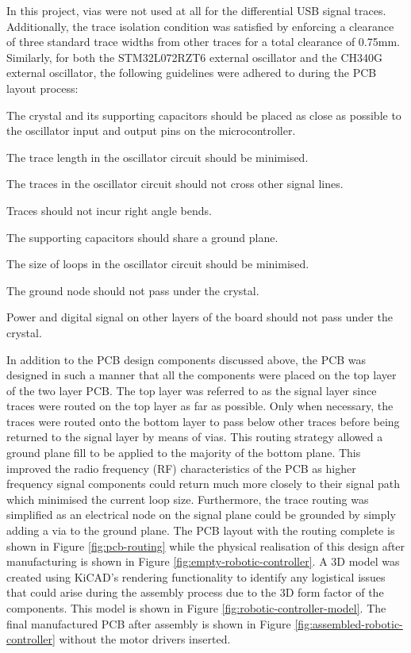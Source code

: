 
In this project, vias were not used at all for the differential USB signal traces. Additionally, the trace isolation condition was satisfied by enforcing a clearance of three standard trace widths from other traces for a total clearance of 0.75mm. Similarly, for both the STM32L072RZT6 external oscillator and the CH340G external oscillator, the following guidelines were adhered to during the PCB layout process:

\begin{compactitem}
	\item The crystal and its supporting capacitors should be placed as close as possible to the oscillator input and output pins on the microcontroller.
	\item The trace length in the oscillator circuit should be minimised.
	\item The traces in the oscillator circuit should not cross other signal lines.
	\item Traces should not incur right angle bends.
	\item The supporting capacitors should share a ground plane.
	\item The size of loops in the oscillator circuit should be minimised.
	\item The ground node should not pass under the crystal.
	\item Power and digital signal on other layers of the board should not pass under the crystal. 
\end{compactitem}

In addition to the PCB design components discussed above, the PCB was designed in such a manner that all the components were placed on the top layer of the two layer PCB. The top layer was referred to as the signal layer since traces were routed on the top layer as far as possible. Only when necessary, the traces were routed onto the bottom layer to pass below other traces before being returned to the signal layer by means of vias. This routing strategy allowed a ground plane fill to be applied to the majority of the bottom plane. This improved the radio frequency (RF) characteristics of the PCB as higher frequency signal components could return much more closely to their signal path which minimised the current loop size. Furthermore, the trace routing was simplified as an electrical node on the signal plane could be grounded by simply adding a via to the ground plane. The PCB layout with the routing complete is shown in Figure \ref{fig:pcb-routing} while the physical realisation of this design after manufacturing is shown in Figure \ref{fig:empty-robotic-controller}. A 3D model was created using KiCAD's rendering functionality to identify any logistical issues that could arise during the assembly process due to the 3D form factor of the components. This model is shown in Figure \ref{fig:robotic-controller-model}. The final manufactured PCB after assembly is shown in Figure \ref{fig:assembled-robotic-controller} without the motor drivers inserted.

